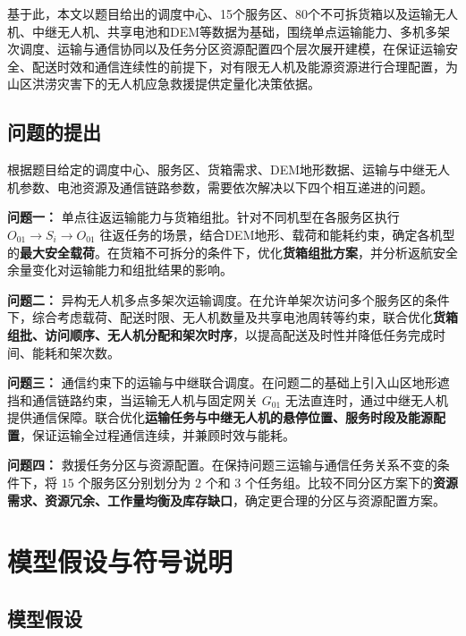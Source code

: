 \documentclass[bwprint,fontset=fandol]{gmcmthesis}
\begin{document}
基于此，本文以题目给出的调度中心、15个服务区、80个不可拆货箱以及运输无人机、中继无人机、共享电池和DEM等数据为基础，围绕单点运输能力、多机多架次调度、运输与通信协同以及任务分区资源配置四个层次展开建模，在保证运输安全、配送时效和通信连续性的前提下，对有限无人机及能源资源进行合理配置，为山区洪涝灾害下的无人机应急救援提供定量化决策依据。
\subsection{问题的提出}


\noindent 根据题目给定的调度中心、服务区、货箱需求、DEM地形数据、运输与中继无人机参数、电池资源及通信链路参数，需要依次解决以下四个相互递进的问题。

\textbf{问题一：} 单点往返运输能力与货箱组批。针对不同机型在各服务区执行
$O_{01}\rightarrow S_i\rightarrow O_{01}$
往返任务的场景，结合DEM地形、载荷和能耗约束，确定各机型的\textbf{最大安全载荷}。在货箱不可拆分的条件下，优化\textbf{货箱组批方案}，并分析返航安全余量变化对运输能力和组批结果的影响。

\textbf{问题二：} 异构无人机多点多架次运输调度。在允许单架次访问多个服务区的条件下，综合考虑载荷、配送时限、无人机数量及共享电池周转等约束，联合优化\textbf{货箱组批、访问顺序、无人机分配和架次时序}，以提高配送及时性并降低任务完成时间、能耗和架次数。

\textbf{问题三：} 通信约束下的运输与中继联合调度。在问题二的基础上引入山区地形遮挡和通信链路约束，当运输无人机与固定网关 $G_{01}$ 无法直连时，通过中继无人机提供通信保障。联合优化\textbf{运输任务与中继无人机的悬停位置、服务时段及能源配置}，保证运输全过程通信连续，并兼顾时效与能耗。

\textbf{问题四：} 救援任务分区与资源配置。在保持问题三运输与通信任务关系不变的条件下，将 $15$ 个服务区分别划分为 $2$ 个和 $3$ 个任务组。比较不同分区方案下的\textbf{资源需求、资源冗余、工作量均衡及库存缺口}，确定更合理的分区与资源配置方案。

\clearpage

\section{模型假设与符号说明}
\subsection{模型假设}
\end{document}

